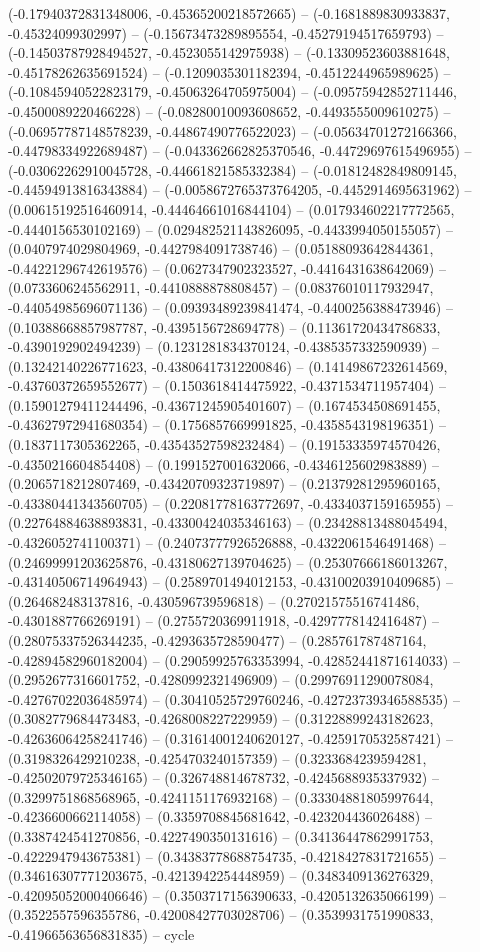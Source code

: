 (-0.17940372831348006, -0.45365200218572665) -- (-0.1681889830933837, -0.45324099302997) -- (-0.15673473289895554, -0.45279194517659793) -- (-0.14503787928494527, -0.4523055142975938) -- (-0.13309523603881648, -0.45178262635691524) -- (-0.1209035301182394, -0.4512244965989625) -- (-0.10845940522823179, -0.45063264705975004) -- (-0.09575942852711446, -0.4500089220466228) -- (-0.08280010093608652, -0.4493555009610275) -- (-0.06957787148578239, -0.44867490776522023) -- (-0.05634701272166366, -0.44798334922689487) -- (-0.043362662825370546, -0.44729697615496955) -- (-0.03062262910045728, -0.44661821585332384) -- (-0.01812482849809145, -0.44594913816343884) -- (-0.0058672765373764205, -0.4452914695631962) -- (0.00615192516460914, -0.44464661016844104) -- (0.017934602217772565, -0.4440156530102169) -- (0.029482521143826095, -0.4433994050155057) -- (0.0407974029804969, -0.4427984091738746) -- (0.05188093642844361, -0.44221296742619576) -- (0.0627347902323527, -0.4416431638642069) -- (0.0733606245562911, -0.4410888878808457) -- (0.08376010117932947, -0.44054985696071136) -- (0.09393489239841474, -0.4400256388473946) -- (0.10388668857987787, -0.4395156728694778) -- (0.11361720434786833, -0.4390192902494239) -- (0.1231281834370124, -0.4385357332590939) -- (0.13242140226771623, -0.43806417312200846) -- (0.14149867232614569, -0.43760372659552677) -- (0.1503618414475922, -0.4371534711957404) -- (0.15901279411244496, -0.43671245905401607) -- (0.1674534508691455, -0.43627972941680354) -- (0.1756857669991825, -0.4358543198196351) -- (0.1837117305362265, -0.43543527598232484) -- (0.19153335974570426, -0.4350216604854408) -- (0.1991527001632066, -0.4346125602983889) -- (0.2065718212807469, -0.43420709323719897) -- (0.21379281295960165, -0.43380441343560705) -- (0.22081778163772697, -0.4334037159165955) -- (0.22764884638893831, -0.43300424035346163) -- (0.23428813488045494, -0.4326052741100371) -- (0.24073777926526888, -0.4322061546491468) -- (0.24699991203625876, -0.43180627139704625) -- (0.25307666186013267, -0.43140506714964943) -- (0.2589701494012153, -0.43100203910409685) -- (0.264682483137816, -0.430596739596818) -- (0.27021575516741486, -0.4301887766269191) -- (0.2755720369911918, -0.4297778142416487) -- (0.28075337526344235, -0.4293635728590477) -- (0.285761787487164, -0.42894582960182004) -- (0.29059925763353994, -0.42852441871614033) -- (0.2952677316601752, -0.4280992321496909) -- (0.29976911290078084, -0.42767022036485974) -- (0.30410525729760246, -0.42723739346588535) -- (0.3082779684473483, -0.4268008227229959) -- (0.31228899243182623, -0.42636064258241746) -- (0.31614001240620127, -0.4259170532587421) -- (0.3198326429210238, -0.4254703240157359) -- (0.3233684239594281, -0.42502079725346165) -- (0.326748814678732, -0.4245688935337932) -- (0.3299751868568965, -0.4241151176932168) -- (0.33304881805997644, -0.4236600662114058) -- (0.3359708845681642, -0.423204436026488) -- (0.3387424541270856, -0.4227490350131616) -- (0.34136447862991753, -0.4222947943675381) -- (0.34383778688754735, -0.4218427831721655) -- (0.34616307771203675, -0.4213942254448959) -- (0.3483409136276329, -0.42095052000406646) -- (0.3503717156390633, -0.4205132635066199) -- (0.3522557596355786, -0.42008427703028706) -- (0.3539931751990833, -0.41966563656831835) -- cycle

